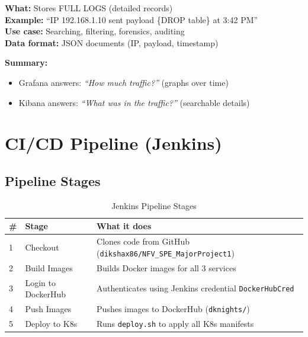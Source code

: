 \documentclass[12pt,a4paper]{article}
\begin{document}
\begin{tcolorbox}[colback=green!5, colframe=green!50!black, title=Elasticsearch + Kibana (Logging)]
\textbf{What:} Stores FULL LOGS (detailed records)\\
\textbf{Example:} ``IP 192.168.1.10 sent payload \{DROP table\} at 3:42 PM''\\
\textbf{Use case:} Searching, filtering, forensics, auditing\\
\textbf{Data format:} JSON documents (IP, payload, timestamp)
\end{tcolorbox}

\textbf{Summary:}
\begin{itemize}
    \item Grafana answers: \textit{``How much traffic?''} (graphs over time)
    \item Kibana answers: \textit{``What was in the traffic?''} (searchable details)
\end{itemize}

\section{CI/CD Pipeline (Jenkins)}

\subsection{Pipeline Stages}

\begin{table}[h]
\centering
\begin{tabular}{@{}llp{8cm}@{}}
\toprule
\textbf{\#} & \textbf{Stage} & \textbf{What it does} \\
\midrule
1 & Checkout & Clones code from GitHub (\texttt{dikshax86/NFV\_SPE\_MajorProject1}) \\
2 & Build Images & Builds Docker images for all 3 services \\
3 & Login to DockerHub & Authenticates using Jenkins credential \texttt{DockerHubCred} \\
4 & Push Images & Pushes images to DockerHub (\texttt{dknights/}) \\
5 & Deploy to K8s & Runs \texttt{deploy.sh} to apply all K8s manifests \\
\bottomrule
\end{tabular}
\caption{Jenkins Pipeline Stages}
\end{table}
\end{document}
